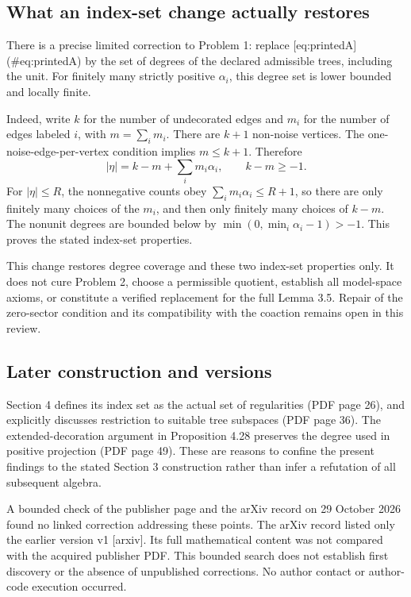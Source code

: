 \documentclass[10pt]{article}
\begin{document}
\subsection*{What an index-set change actually restores}
There is a precise limited correction to Problem 1: replace [eq:printedA] (\#eq:printedA) by the set of degrees of the declared admissible trees, including the unit. For finitely many strictly positive \(\alpha_i\), this degree set is lower bounded and locally finite.\par
Indeed, write \(k\) for the number of undecorated edges and \(m_i\) for the number of edges labeled \(i\), with \(m=\sum_i m_i\). There are \(k+1\) non-noise vertices. The one-noise-edge-per-vertex condition implies \(m\le k+1\). Therefore \[|\eta|=k-m+\sum_i m_i\alpha_i,\qquad k-m\ge-1.\] For \(|\eta|\le R\), the nonnegative counts obey \(\sum_i m_i\alpha_i\le R+1\), so there are only finitely many choices of the \(m_i\), and then only finitely many choices of \(k-m\). The nonunit degrees are bounded below by \(\min(0,\min_i\alpha_i-1)>-1\). This proves the stated index-set properties.\par
This change restores degree coverage and these two index-set properties only. It does not cure Problem 2, choose a permissible quotient, establish all model-space axioms, or constitute a verified replacement for the full Lemma 3.5. Repair of the zero-sector condition and its compatibility with the coaction remains open in this review.\par
\subsection*{Later construction and versions}
Section 4 defines its index set as the actual set of regularities (PDF page 26), and explicitly discusses restriction to suitable tree subspaces (PDF page 36). The extended-decoration argument in Proposition 4.28 preserves the degree used in positive projection (PDF page 49). These are reasons to confine the present findings to the stated Section 3 construction rather than infer a refutation of all subsequent algebra.\par
A bounded check of the publisher page and the arXiv record on 29 October 2026 found no linked correction addressing these points. The arXiv record listed only the earlier version v1 [arxiv]. Its full mathematical content was not compared with the acquired publisher PDF. This bounded search does not establish first discovery or the absence of unpublished corrections. No author contact or author-code execution occurred.\par
\end{document}
